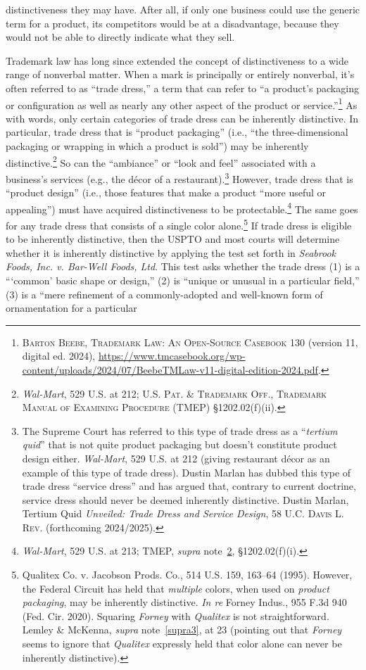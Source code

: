 \documentclass[letterpaper, 11pt, oneside]{article}
\begin{document}
distinctiveness they may have. After all, if only one business could use the generic term for a product, its competitors would be at a disadvantage, because they would not be able to directly indicate what they sell.

Trademark law has long since extended the concept of distinctiveness to a wide range of nonverbal matter. When a mark is principally or entirely nonverbal, it's often referred to as ``trade dress,'' a term that can refer to ``a product’s packaging or configuration as well as nearly any other aspect of the product or service.''\footnote{\textsc{Barton Beebe, Trademark Law: An Open-Source Casebook} 130 (version 11, digital ed. 2024), \url{https://www.tmcasebook.org/wp-content/uploads/2024/07/BeebeTMLaw-v11-digital-edition-2024.pdf}.} As with words, only certain categories of trade dress can be inherently distinctive. In particular, trade dress that is ``product packaging'' (i.e., ``the three-dimensional packaging or wrapping in which a product is sold'') may be inherently distinctive.\footnote{\label{supra12} \textit{Wal-Mart}, 529 U.S. at 212; \textsc{U.S. Pat. \& Trademark Off., Trademark Manual of Examining Procedure} (TMEP) \S 1202.02(f)(ii).} So can the ``ambiance'' or ``look and feel'' associated with a business's services (e.g., the décor of a restaurant).\footnote{The Supreme Court has referred to this type of trade dress as a ``\textit{tertium quid}'' that is not quite product packaging but doesn't constitute product design either. \textit{Wal-Mart}, 529 U.S. at 212 (giving restaurant décor as an example of this type of trade dress). Dustin Marlan has dubbed this type of trade dress ``service dress'' and has argued that, contrary to current doctrine, service dress should never be deemed inherently distinctive. Dustin Marlan, Tertium Quid \textit{Unveiled: Trade Dress and Service Design}, 58 \textsc{U.C. Davis L. Rev.} (forthcoming 2024/2025).} However, trade dress that is ``product design'' (i.e., those features that make a product ``more useful or appealing'') must have acquired distinctiveness to be protectable.\footnote{\textit{Wal-Mart}, 529 U.S. at 213; TMEP, \textit{supra} note~\ref{supra12}, \S 1202.02(f)(i).} The same goes for any trade dress that consists of a single color alone.\footnote{Qualitex Co. v. Jacobson Prods. Co., 514 U.S. 159, 163–64 (1995). However, the Federal Circuit has held that \textit{multiple} colors, when used on \textit{product packaging}, may be inherently distinctive. \textit{In re} Forney Indus., 955 F.3d 940 (Fed. Cir. 2020). Squaring \textit{Forney} with \textit{Qualitex} is not straightforward. Lemley \& McKenna, \textit{supra} note~\ref{supra3}, at 23 (pointing out that \textit{Forney} seems to ignore that \textit{Qualitex} expressly held that color alone can never be inherently distinctive).} If trade dress is eligible to be inherently distinctive, then the USPTO and most courts will determine whether it is inherently distinctive by applying the test set forth in \textit{Seabrook Foods, Inc. v. Bar-Well Foods, Ltd}. This test asks whether the trade dress (1) is a ```common' basic shape or design,'' (2) is ``unique or unusual in a particular field,'' (3) is a ``mere refinement of a commonly-adopted and well-known form of ornamentation for a particular 
\end{document}
